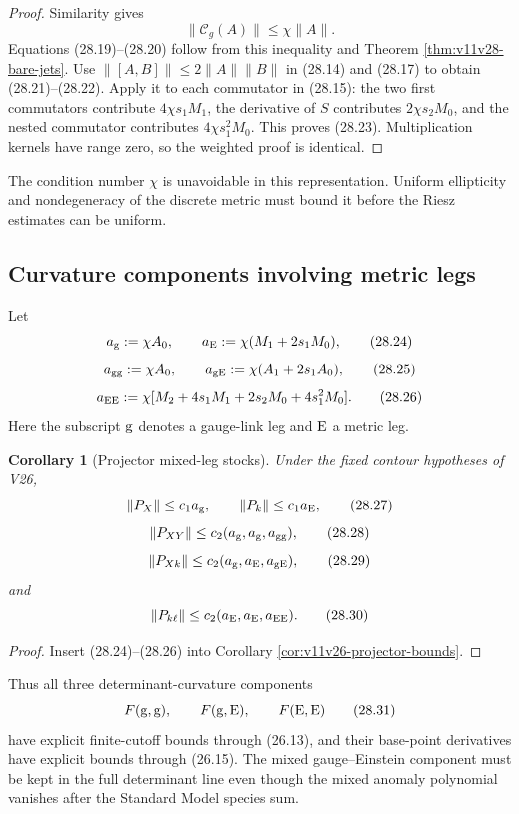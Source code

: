 \documentclass[11pt]{article}
\newtheorem{corollary}[theorem]{Corollary}
\begin{document}
\begin{proof}
Similarity gives
\[
 \|\mathcal C_g(A)\|\leq\chi\|A\|.
\]
Equations (28.19)--(28.20) follow from this inequality and
Theorem \ref{thm:v11v28-bare-jets}.  Use
\(\|[A,B]\|\leq2\|A\|\|B\|\) in (28.14) and (28.17) to obtain
(28.21)--(28.22).  Apply it to each commutator in (28.15):
the two first commutators contribute \(4\chi s_1M_1\), the derivative
of \(S\) contributes \(2\chi s_2M_0\), and the nested commutator
contributes \(4\chi s_1^2M_0\).  This proves (28.23).
Multiplication kernels have range zero, so the weighted proof is
identical.
\end{proof}

The condition number \(\chi\) is unavoidable in this representation.
Uniform ellipticity and nondegeneracy of the discrete metric must bound
it before the Riesz estimates can be uniform.

\subsection{Curvature components involving metric legs}

Let
\[
 a_{\rm g}:=\chi A_0,\qquad
 a_{\rm E}:=\chi(M_1+2s_1M_0),
 \tag{28.24}
\]
\[
 a_{\rm gg}:=\chi A_0,\qquad
 a_{\rm gE}:=\chi(A_1+2s_1A_0),
 \tag{28.25}
\]
\[
 a_{\rm EE}:=
 \chi[M_2+4s_1M_1+2s_2M_0+4s_1^2M_0].
 \tag{28.26}
\]
Here the subscript \({\rm g}\) denotes a gauge-link leg and
\({\rm E}\) a metric leg.

\begin{corollary}[Projector mixed-leg stocks]
\label{cor:v11v28-projector-mixed}
Under the fixed contour hypotheses of V26,
\[
 \|P_X\|\leq c_1a_{\rm g},\qquad
 \|P_k\|\leq c_1a_{\rm E},
 \tag{28.27}
\]
\[
 \|P_{XY}\|\leq c_2(a_{\rm g},a_{\rm g},a_{\rm gg}),
 \tag{28.28}
\]
\[
 \|P_{Xk}\|\leq c_2(a_{\rm g},a_{\rm E},a_{\rm gE}),
 \tag{28.29}
\]
and
\[
 \|P_{k\ell}\|\leq c_2(a_{\rm E},a_{\rm E},a_{\rm EE}).
 \tag{28.30}
\]
\end{corollary}

\begin{proof}
Insert (28.24)--(28.26) into
Corollary \ref{cor:v11v26-projector-bounds}.
\end{proof}

Thus all three determinant-curvature components
\[
 F({\rm g},{\rm g}),\qquad
 F({\rm g},{\rm E}),\qquad
 F({\rm E},{\rm E})
 \tag{28.31}
\]
have explicit finite-cutoff bounds through (26.13), and their
base-point derivatives have explicit bounds through (26.15).  The
mixed gauge--Einstein component must be kept in the full determinant
line even though the mixed anomaly polynomial vanishes after the
Standard Model species sum.
\end{document}
